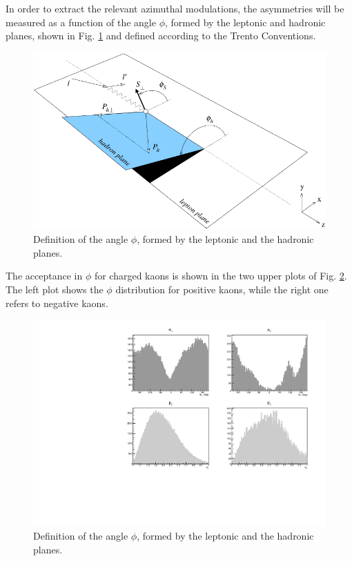 In order to extract the relevant azimuthal modulations, the asymmetries will be measured as a function of the angle $\phi$, formed by the leptonic and hadronic planes, shown in Fig. \ref{fig::phi_angle} and defined according to the Trento Conventions.
%
%
\begin{figure}
\centering
\includegraphics[width=1.0\textwidth]{sidis/anglestrento.pdf}
\caption{\label{fig::phi_angle} Definition of the angle $\phi$, formed by the leptonic and the hadronic planes.}
\end{figure}
%
The acceptance in $\phi$ for charged kaons is shown in the two upper plots of Fig. \ref{fig::phi_pt_kpm}. The left plot shows the $\phi$ distribution for positive kaons, while the right one refers to negative kaons.
%
%
\begin{figure}
\centering
\includegraphics[width=1.0\textwidth]{sidis/phi_pt_kpm.pdf}
\caption{\label{fig::phi_pt_kpm} Definition of the angle $\phi$, formed by the leptonic and the hadronic planes.}
\end{figure}
%
%
%
